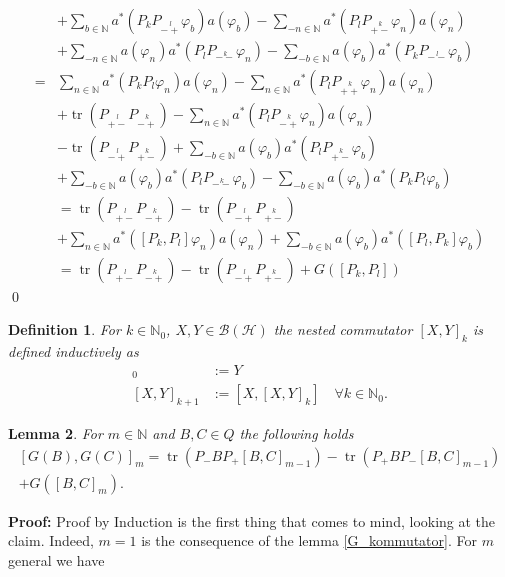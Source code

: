 \documentclass[b5paper,draft,openbib,12pt]{memoir}
\newtheorem{Def}{Definition}[section]
\newtheorem{Lemma}[Def]{Lemma}
\DeclareMathOperator{\tr}{tr}
\begin{document}
\begin{align*}
&+\sum_{b\in\mathbb{N}}a^*\left(P_k P_{\stackrel{l}{-+}}\varphi_b\right)a(\varphi_b)-\sum_{-n\in\mathbb{N}}a^*\left(P_l P_{\stackrel{k}{+-}}\varphi_n\right) a(\varphi_n)\\
&+\sum_{-n\in\mathbb{N}}a(\varphi_n)a^*\left(P_l P_{\stackrel{k}{--}}\varphi_n\right) - \sum_{-b \in \mathbb{N}} a(\varphi_b)a^*\left(P_k P_{\stackrel{l}{--}}\varphi_b\right)\\
=&\sum_{n\in\mathbb{N}} a^*\left(P_k P_l \varphi_n \right) a(\varphi_n) - \sum_{n\in\mathbb{N}} a^*\left(P_l P_{\stackrel{k}{++}} \varphi_n \right) a(\varphi_n)\\
&+\tr \left( P_{\stackrel{l}{+-}} P_{\stackrel{k}{-+}}\right) - \sum_{n\in\mathbb{N}} a^*\left( P_l P_{\stackrel{k}{-+}} \varphi_n\right)a(\varphi_n)\\
&-\tr \left( P_{\stackrel{l}{-+}} P_{\stackrel{k}{+-}}\right) + \sum_{-b\in\mathbb{N}} a(\varphi_b) a^*\left(P_l P_{\stackrel{k}{+-}} \varphi_b\right)\\
&+\sum_{-b\in\mathbb{N}} a(\varphi_b) a^*\left( P_l P_{\stackrel{k}{--}}\varphi_b\right) - \sum_{-b\in\mathbb{N}} a(\varphi_b) a^*\left( P_k P_l \varphi_b\right)\\
&=\tr \left( P_{\stackrel{l}{+-}} P_{\stackrel{k}{-+}}\right)
-\tr \left( P_{\stackrel{l}{-+}} P_{\stackrel{k}{+-}}\right)\\
&+\sum_{n\in\mathbb{N}} a^*\left(\left[P_k ,P_l\right] \varphi_n \right) a(\varphi_n)
+\sum_{-b\in\mathbb{N}} a(\varphi_b)a^*\left(\left[P_l ,P_k\right] \varphi_b \right) \\
&=\tr \left( P_{\stackrel{l}{+-}} P_{\stackrel{k}{-+}}\right)
-\tr \left( P_{\stackrel{l}{-+}} P_{\stackrel{k}{+-}}\right)
+G\left(\left[P_k,P_l\right]\right)
\end{align*}
\qed

\begin{Def}
For \(k\in\mathbb{N}_0\), \(X,Y\in \mathcal{B}(\mathcal{H})\) the nested commutator \([X,Y]_k\) is defined inductively as
\begin{align*}
[X,Y]_0&:= Y\\
[X,Y]_{k+1}&:=[X,[X,Y]_{k}] \quad \forall k\in\mathbb{N}_0.
\end{align*}
\end{Def}

\begin{Lemma}\label{nested_kommuted_G}
For \(m\in\mathbb{N}\) and \(B,C \in Q\) the following holds
\begin{multline}
\left[ G(B),G(C)\right]_m=  \tr\left(P_-BP_+[B,C]_{m-1}\right) - \tr\left(P_+BP_-[B,C]_{m-1}\right)\\
+G\left([B,C]_m\right) .
\end{multline}
\end{Lemma}
\textbf{Proof:} Proof by Induction is the first thing that comes to mind, looking at the claim. Indeed, \(m=1\) is the consequence
of the lemma \ref{G_kommutator}. For \(m\) general we have
\end{document}
